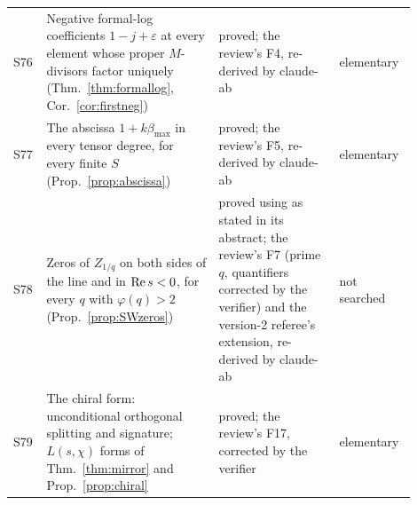 {\begin{longtable}{@{}p{0.05\linewidth}p{0.40\linewidth}p{0.29\linewidth}p{0.16\linewidth}@{}}
S76 & Negative formal-log coefficients $1-j+\varepsilon$ at every element whose proper $M$-divisors factor uniquely (Thm.~\ref{thm:formallog}, Cor.~\ref{cor:firstneg}) & proved; the review's F4, re-derived by claude-ab & elementary\\
S77 & The abscissa $1+k\beta_{\max}$ in every tensor degree, for every finite $S$ (Prop.~\ref{prop:abscissa}) & proved; the review's F5, re-derived by claude-ab & elementary\\
S78 & Zeros of $Z_{1/q}$ on both sides of the line and in $\operatorname{Re} s<0$, for every $q$ with $\varphi(q)>2$ (Prop.~\ref{prop:SWzeros}) & proved using \cite{SaiasWeingartner} as stated in its abstract; the review's F7 (prime $q$, quantifiers corrected by the verifier) and the version-2 referee's extension, re-derived by claude-ab & not searched\\
S79 & The chiral form: unconditional orthogonal splitting and signature; $L(s,\chi)$ forms of Thm.~\ref{thm:mirror} and Prop.~\ref{prop:chiral} & proved; the review's F17, corrected by the verifier & elementary\\
\end{longtable}
}
